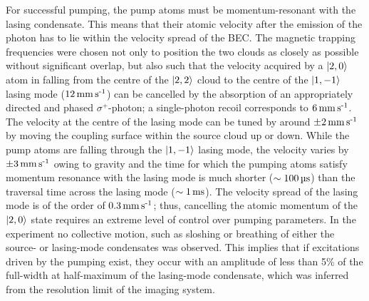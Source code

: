 For successful pumping, the pump atoms must be momentum-resonant with the lasing condensate.  This means that their atomic velocity after the emission of the photon has to lie within the velocity spread of the BEC.  The magnetic trapping frequencies were chosen not only to position the two clouds as closely as possible without significant overlap, but also such that the velocity acquired by a ${\left|2, 0\right>}$ atom in falling from the centre of the ${\left|2, 2\right>}$ cloud to the centre of the ${\left|1, -1\right>}$ lasing mode ($\unit[12]{mm\, s\textsuperscript{-1}}$) can be cancelled by the absorption of an appropriately directed and phased $\sigma^{+}$-photon; a single-photon recoil corresponds to $\unit[6]{mm\, s\textsuperscript{-1}}$.  The velocity at the centre of the lasing mode can be tuned by around $\unit[\pm 2]{mm\, s\textsuperscript{-1}}$ by moving the coupling surface within the source cloud up or down.  While the pump atoms are falling through the ${\left|1, -1\right>}$ lasing mode, the velocity varies by $\unit[\pm 3]{mm\, s\textsuperscript{-1}}$ owing to gravity and the time for which the pumping atoms satisfy momentum resonance with the lasing mode is much shorter ($\sim \unit[100]{\micro s}$) than the traversal time across the lasing mode ($\sim\unit[1]{ms}$).  The velocity spread of the lasing mode is of the order of $\unit[0.3]{mm\, s\textsuperscript{-1}}$; thus, cancelling the atomic momentum of the ${\left|2, 0\right>}$ state requires an extreme level of control over pumping parameters.  In the experiment no collective motion, such as sloshing or breathing of either the source- or lasing-mode condensates was observed.  This implies that if excitations driven by the pumping exist, they occur with an amplitude of less than 5\% of the full-width at half-maximum of the lasing-mode condensate, which was inferred from the resolution limit of the imaging system.

